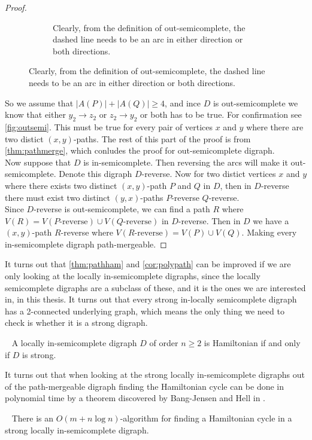 \begin{proof}
\begin{figure}
\begin{subfigure}{0.60\textwidth}
            \caption{Clearly, from the definition of out-semicomplete, the dashed line needs to be an arc in either direction or both directions.}
            \label{fig:outsemi}
        \end{subfigure}
    \end{figure}
    So we assume that $|A(P)|+|A(Q)|\geq 4$, and ince $D$ is out-semicomplete we know that either $y_2\rightarrow z_2$ or $z_2\rightarrow y_2$ or both has to be true. 
    For confirmation see \autoref{fig:outsemi}.
    This must be true for every pair of vertices $x$ and $y$ where there are two distict $(x,y)$-paths. The rest of this part of the proof is from \autoref{thm:pathmerge}, which conludes the proof for out-semicomplete digraph.\\

    Now suppose that $D$ is in-semicomplete. 
    Then reversing the arcs will make it out-semicomplete. Denote this digraph $D$-reverse. 
    Now for two distict vertices $x$ and $y$ where there exists two distinct $(x,y)$-path $P$ and $Q$ in $D$, then in $D$-reverse there must exist two distinct $(y,x)$-paths $P$-reverse $Q$-reverse. \\
    Since $D$-reverse is out-semicomplete, we can find a path $R$ where $V(R)=V(P\text{-reverse}) \cup V(Q\text{-reverse})$ in $D$-reverse. 
    Then in $D$ we have a $(x,y)$-path $R$-reverse where $V(R\text{-reverse})=V(P)\cup V(Q)$. 
    Making every in-semicomplete digraph path-mergeable.   
\end{proof}


It turns out that \autoref{thm:pathham} and \autoref{cor:polypath} can be improved if we are only looking at the locally in-semicomplete digraphs, since the locally semicomplete digraphs are a subclass of these, and it is the ones we are interested in, in this thesis. 
It turns out that every strong in-locally semicomplete digraph has a 2-connected underlying graph, which means the only thing we need to check is whether it is a strong digraph.
\begin{thm}~\cite{bangJCT59}
    A locally in-semicomplete digraph $D$ of order $n\geq 2$ is Hamiltonian if and only if $D$ is strong.
\end{thm}

It turns out that when looking at the strong locally in-semicomplete digraphs out of the path-mergeable digraph finding the Hamiltonian cycle can be done in polynomial time by a theorem discovered by Bang-Jensen and Hell in \cite{bangDM41}.
\begin{thm}~\cite{bangDM41}
    There is an $O(m+n\log n)$-algorithm for finding a Hamiltonian cycle in a strong locally in-semicomplete digraph.
\end{thm}

